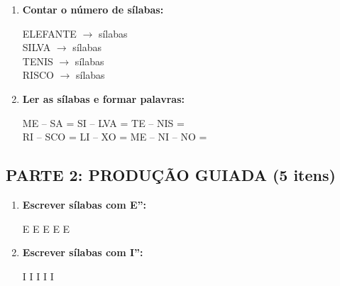 \begin{exercicio}
\begin{enumerate}
  \item \textbf{Contar o número de sílabas:}
  \begin{center}
  ELEFANTE $\rightarrow$ \underline{\hspace{1cm}} sílabas \\
  SILVA $\rightarrow$ \underline{\hspace{1cm}} sílabas \\
  TENIS $\rightarrow$ \underline{\hspace{1cm}} sílabas \\
  RISCO $\rightarrow$ \underline{\hspace{1cm}} sílabas
  \end{center}

  \item \textbf{Ler as sílabas e formar palavras:}
  \begin{center}
  ME -- SA = \underline{\hspace{2cm}} \quad SI -- LVA = \underline{\hspace{2cm}} \quad TE -- NIS = \underline{\hspace{2cm}} \\
  RI -- SCO = \underline{\hspace{2cm}} \quad LI -- XO = \underline{\hspace{2cm}} \quad ME -- NI -- NO = \underline{\hspace{2cm}}
  \end{center}
\end{enumerate}

\subsection*{PARTE 2: PRODUÇÃO GUIADA (5 itens)}

\begin{enumerate}[resume]
  \item \textbf{Escrever sílabas com E'':}
  \begin{center}
  \underline{\hspace{1.5cm}}E \quad \underline{\hspace{1.5cm}}E \quad \underline{\hspace{1.5cm}}E \quad \underline{\hspace{1.5cm}}E \quad \underline{\hspace{1.5cm}}E
  \end{center}

  \item \textbf{Escrever sílabas com I'':}
  \begin{center}
  \underline{\hspace{1.5cm}}I \quad \underline{\hspace{1.5cm}}I \quad \underline{\hspace{1.5cm}}I \quad \underline{\hspace{1.5cm}}I \quad \underline{\hspace{1.5cm}}I
  \end{center}


\end{enumerate}
\end{exercicio}

